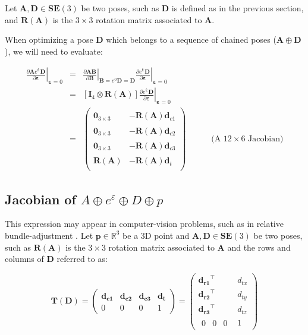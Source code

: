 \documentclass[a4paper,11pt]{report}
\newcommand{\E}{{\bm{\varepsilon}}}
\newcommand{\A}{{\mathbf{A}}}
\newcommand{\B}{{\mathbf{B}}}
\newcommand{\D}{{\mathbf{D}}}
\newcommand{\I}{{\mathbf{I}}}
\begin{document}
Let $\A,\D \in \mathbf{SE}(3)$ be two poses, such as
$\D$ is defined as in the previous section, and $\mathbf{R}(\A)$ is
the $3\times 3$ rotation matrix associated to $\A$.

When optimizing a pose $\D$ which belongs to a sequence of chained poses
($\A \oplus \D$), we will need to evaluate:

\begin{eqnarray}
\label{eq:jacob.AeD}
\left. \frac{\partial \A e^\E \D}{\partial \E} \right|_{\E = 0}
&=&
\left. \frac{\partial \A \B}{\partial \B} \right|_{\B= e^0 \D = \D}
\left. \frac{\partial e^\E \mathbf{D}}{\partial \E} \right|_{\E = 0}
\\
&=&
\left[ \I_4 \otimes \mathbf{R}(\A) \right]
\left. \frac{\partial e^\E \mathbf{D}}{\partial \E} \right|_{\E = 0}
\\
&=&
\left(
\begin{array}{cc}
 \mathbf{0}_{3\times 3}  & -\mathbf{R}(\A) \hat{\mathbf{d}}_{c1} \\
 \mathbf{0}_{3\times 3}  & -\mathbf{R}(\A) \hat{\mathbf{d}}_{c2} \\
 \mathbf{0}_{3\times 3}  & -\mathbf{R}(\A) \hat{\mathbf{d}}_{c3} \\
 \mathbf{R}(\A)          & -\mathbf{R}(\A) \hat{\mathbf{d}}_{t} \\
\end{array}
\right)
\quad\quad\quad \text{(A $12 \times 6$ Jacobian)}
\end{eqnarray}


\subsection{Jacobian of $A \oplus e^\varepsilon \oplus D \oplus p$}
\label{eq:jacob_A_e_D_p}

This expression may appear in computer-vision problems,
such as in relative bundle-adjustment \cite{sibley2009rba}.
Let $\mathbf{p} \in \mathbb{R}^3$ be a 3D point
and $\A,\D \in \mathbf{SE}(3)$ be two poses, such as
$\mathbf{R}(\A)$ is the $3\times 3$ rotation matrix associated to $\A$ and
the rows and columns of $\D$ referred to as:

\begin{equation}
\mathbf{T}(\mathbf{D}) =
\left(
\begin{array}{ccc|c}
 \mathbf{d_{c1}}  & \mathbf{d_{c2}}  & \mathbf{d_{c3}}  & \mathbf{d_{t}}  \\
\hline
  0 & 0 & 0 & 1
\end{array}
\right)
=
\left(
\begin{array}{c|c}
    \mathbf{d_{r1}}^\top  & d_{tx}  \\
    \mathbf{d_{r2}}^\top  & d_{ty} \\
    \mathbf{d_{r3}}^\top  & d_{tz} \\
\hline
  \begin{array}{ccc}
    0  & 0  & 0
  \end{array}
    & 1
\end{array}
\right)
\end{equation}
\end{document}

